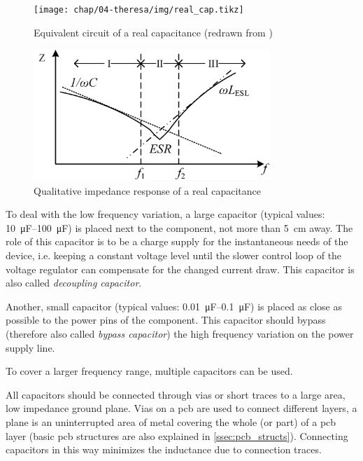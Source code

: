 \tikzexternaldisable
\begin{figure}[tbh]
	\centering
	\texttt{[image: chap/04-theresa/img/real\_cap.tikz]}
	\caption[Capacitor equivalent circuit]{Equivalent circuit of a real capacitance (redrawn from \cite{decouple})}
	\label{fig:real_cap}
\end{figure}
\tikzexternalenable
\begin{figure}[tbh]
	\centering
	\includegraphics[width = 0.8\textwidth]{chap/04-theresa/img/esl_esr}
	\caption[Impedance response of a real capacitor]{Qualitative impedance response of a real capacitance \cite{Dang2020}}
	\label{fig:esl_esr}
\end{figure}


To deal with the low frequency variation, a large capacitor (typical values: \SIrange{10}{100}{\micro\farad}) is placed next to the component, not more than \SI{5}{\centi \metre} away.
The role of this capacitor is to be a charge supply for the instantaneous needs of the device, i.e. keeping a constant voltage level until the slower control loop of the voltage regulator can compensate for the changed current draw. \cite{decouple}
This capacitor is also called \textit{decoupling capacitor}.

Another, small capacitor (typical values: \SIrange{0.01}{0.1}{\micro \farad}) is placed as close as possible to the power pins of the component.
This capacitor should bypass (therefore also called \textit{bypass capacitor}) the high frequency variation on the power supply line. \cite{decouple}

To cover a larger frequency range, multiple capacitors can be used.

All capacitors should be connected through vias or short traces to a large area, low impedance ground plane. Vias on a \gls{pcb} are used to connect different layers, a plane is an uninterrupted area of metal covering the whole (or part) of a \gls{pcb} layer (basic \gls{pcb} structures are also  explained in \autoref{ssec:pcb_structs}). 
Connecting capacitors in this way minimizes the inductance due to connection traces. \cite{decouple}

